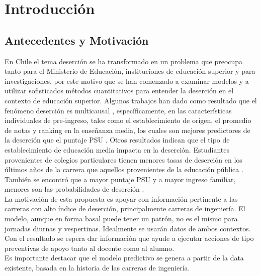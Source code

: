 \chapter[Introducción]{Introducción}
\label{ch:intro}



\section{Antecedentes y Motivación}
\label{sec:motivacion}

En Chile el tema deserción se ha transformado en un problema que preocupa tanto para el Ministerio de Educación, instituciones de educación superior y para investigaciones, por este motivo que se han comenzado a examinar modelos y a utilizar sofisticados métodos cuantitativos para entender la deserción en el contexto de educación superior. Algunos trabajos han dado como resultado que el fenómeno deserción es multicausal \cite{acuna}, específicamente, en las características individuales de pre-ingreso, tales como el establecimiento de origen, el promedio de notas y ranking en la enseñanza media, los cuales son mejores predictores de la deserción que el puntaje PSU  \cite{larroucau}. Otros resultados indican que el tipo de establecimiento de educación media impacta en la deserción. Estudiantes provenientes de colegios particulares tienen menores tasas de deserción en los últimos años de la carrera que aquellos provenientes de la educación pública \cite{celis}. También se encontró que a mayor puntaje PSU y a mayor ingreso familiar, menores son las probabilidades de deserción \cite{diaz}. \\

La motivación de esta propuesta es apoyar con información pertinente a las carreras con alto índice de deserción, principalmente carreras de ingeniería. El modelo, aunque en forma basal puede tener un patrón, no es el mismo para jornadas diurnas y vespertinas. Idealmente se usarán datos de ambos contextos. Con el resultado se espera dar información que ayude a ejecutar acciones de tipo preventivas de apoyo tanto al docente como al alumno.\\ 

Es importante destacar que el modelo predictivo se genera a partir de la data existente, basada en la historia de las carreras de ingeniería.\\








